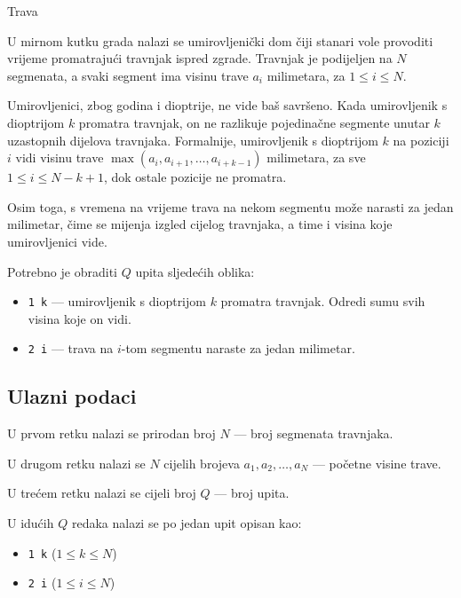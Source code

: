 \begin{statement}[
  problempoints=100,
  timelimit=1 sekunda,
  memorylimit=512 MiB,
]{Trava}\

U mirnom kutku grada nalazi se umirovljenički dom čiji stanari vole provoditi vrijeme promatrajući travnjak ispred zgrade. Travnjak je podijeljen na $N$ segmenata, a svaki segment ima visinu trave $a_i$ milimetara, za $1 \leq i \leq N$.

Umirovljenici, zbog godina i dioptrije, ne vide baš savršeno. Kada umirovljenik s dioptrijom $k$ promatra travnjak, on ne razlikuje pojedinačne segmente unutar $k$ uzastopnih dijelova travnjaka. Formalnije, umirovljenik s dioptrijom $k$ na poziciji $i$ vidi visinu trave $\max(a_i, a_{i+1}, \ldots, a_{i+k-1})$ milimetara, za sve $1 \leq i \leq N - k + 1$, dok ostale pozicije ne promatra.

Osim toga, s vremena na vrijeme trava na nekom segmentu može narasti za jedan milimetar, čime se mijenja izgled cijelog travnjaka, a time i visina koje umirovljenici vide.

Potrebno je obraditi $Q$ upita sljedećih oblika:
\vspace{-0.7em}
\begin{itemize}
    \item \texttt{1 k} — umirovljenik s dioptrijom $k$ promatra travnjak. Odredi sumu svih visina koje on vidi.
    \item \texttt{2 i} — trava na $i$-tom segmentu naraste za jedan milimetar.
\end{itemize}

\subsection*{Ulazni podaci}

U prvom retku nalazi se prirodan broj $N$ — broj segmenata travnjaka.

U drugom retku nalazi se $N$ cijelih brojeva $a_1, a_2, \ldots, a_N$ — početne visine trave.

U trećem retku nalazi se cijeli broj $Q$ — broj upita.

U idućih $Q$ redaka nalazi se po jedan upit opisan kao:
\vspace{-0.7em}
\begin{itemize}
    \item \texttt{1 k} ($1 \leq k \leq N$)
    \item \texttt{2 i} ($1 \leq i \leq N$)
\end{itemize}


\end{statement}

